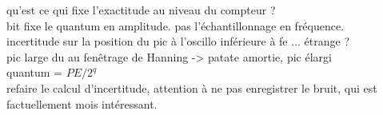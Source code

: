 \documentclass[12pt,prb,aps,epsf]{article}
\begin{document}
qu'est ce qui fixe l'exactitude au niveau du compteur ?\\

bit fixe le quantum en amplitude. pas l'échantillonnage en fréquence.\\

incertitude sur la position du pic à l'oscillo inférieure à fe ... étrange ?\\

pic large du au fenêtrage de Hanning -> patate amortie, pic élargi\\

quantum = $PE/2^q$\\

refaire le calcul d'incertitude, 
attention à ne pas enregistrer le bruit, qui est factuellement mois intéressant.
\end{document}
